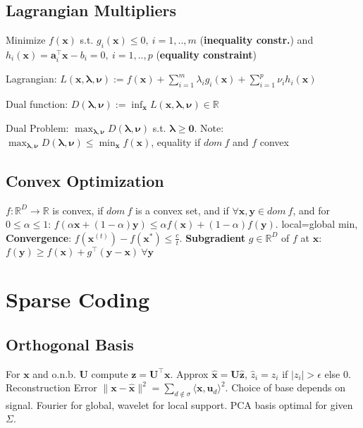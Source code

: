 \documentclass[a4paper, 11pt, landscape]{article}
\begin{document}
\begin{multicols*}{3}
\subsection{Lagrangian Multipliers}
Minimize  $f(\mathbf{x})$ s.t. $g_i(\mathbf{x}) \leq 0,\ i = 1, .., m$ (\textbf{inequality constr.}) and $h_i(\mathbf{x}) = \mathbf{a}_i^\top \mathbf{x} - b_i = 0,\ i = 1, .., p$ (\textbf{equality constraint})
\begin{compactdesc}
	\item[Lagrangian:] $L(\mathbf{x}, \boldsymbol{\lambda}, \boldsymbol{\nu}) := f(\mathbf{x}) + \sum_{i=1}^m \lambda_i g_i(\mathbf{x}) + \sum_{i=1}^p \nu_i h_i(\mathbf{x})$
	\item[Dual function:] $D(\boldsymbol{\lambda}, \boldsymbol{\nu}) := \inf_{\mathbf{x}} L(\mathbf{x}, \boldsymbol{\lambda}, \boldsymbol{\nu}) \in \mathbb{R}$
	\item[Dual Problem:] $\max_{\boldsymbol{\lambda}, \boldsymbol{\nu}} D(\boldsymbol{\lambda}, \boldsymbol{\nu})$ s.t. $\boldsymbol{\lambda} \geq \mathbf{0}$. Note: $\max_{\boldsymbol{\lambda}, \boldsymbol{\nu}} D(\boldsymbol{\lambda}, \boldsymbol{\nu}) \le \min_\mathbf{x}{f(\mathbf{x})}$, equality if $dom\ f$ and $f$ convex
\end{compactdesc}

\subsection{Convex Optimization}
$f : \mathbb{R}^D \rightarrow \mathbb{R}$ is convex, if $dom\ f$ is a convex set, and if $\forall \mathbf{x}, \mathbf{y} \in dom\ f$, and for $0 \leq \alpha \leq 1$: $f(\alpha \mathbf{x} + (1 - \alpha)\mathbf{y}) \leq \alpha f(\mathbf{x}) + (1-\alpha)f(\mathbf{y})$. local=global min, \textbf{Convergence}: $f(\mathbf{x}^{(t)}) - f(\mathbf{x}^*) \le \frac{c}{t}$. 
\textbf{Subgradient} $g \in \mathbb{R}^D$ of $f$ at $\mathbf{x}$: $f(\mathbf{y}) \geq f(\mathbf{x}) + g^\top(\mathbf{y}-\mathbf{x}) \ \forall \mathbf{y}$

\section{Sparse Coding}

\subsection{Orthogonal Basis}
For $\mathbf{x}$ and o.n.b. $\mathbf{U}$ compute $\mathbf{z} = \mathbf{U}^\top \mathbf{x} $. Approx $ \mathbf{\hat{x}} = \mathbf{U\hat{z}}$, $\hat{z}_i = z_i$ if $ \lvert z_i \rvert > \epsilon$ else 0.
Reconstruction Error $\|\mathbf{x}-\mathbf{\hat{x}}\|^2 = \sum_{d\notin\sigma}\langle\mathbf{x},\mathbf{u}_d\rangle ^2$.
Choice of base depends on signal. Fourier for global, wavelet for local support. PCA basis optimal for given $\Sigma$.


\end{multicols*}
\end{document}

